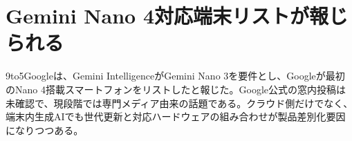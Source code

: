 \section{Gemini Nano 4対応端末リストが報じられる}
9to5Googleは、Gemini IntelligenceがGemini Nano 3を要件とし、Googleが最初のNano 4搭載スマートフォンをリストしたと報じた。Google公式の窓内投稿は未確認で、現段階では専門メディア由来の話題である。クラウド側だけでなく、端末内生成AIでも世代更新と対応ハードウェアの組み合わせが製品差別化要因になりつつある。
